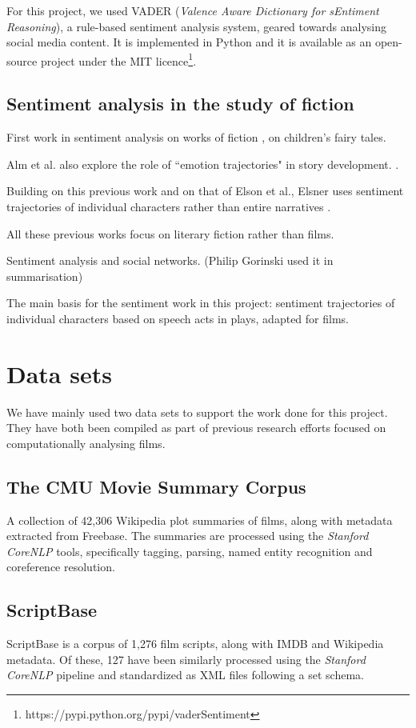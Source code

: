 \documentclass[bsc,frontabs,singlespacing,parskip, twoside]{infthesis}
\begin{document}
For this project, we used VADER (\textit{Valence Aware Dictionary for sEntiment Reasoning})\cite{hutto2014vader}, a rule-based sentiment analysis system, geared towards analysing social media content. It is implemented in Python and it is available as an open-source project under the MIT licence\footnote{https://pypi.python.org/pypi/vaderSentiment}.


\subsection{Sentiment analysis in the study of fiction}
First work in sentiment analysis on works of fiction \cite{alm2005emotions}, on children's fairy tales.

Alm et al. also explore the role of ``emotion trajectories" in story development. \cite{alm2005emotional}.

Building on this previous work and on that of Elson et al., Elsner uses sentiment trajectories of individual characters rather than entire narratives \cite{elsner2012character}.

All these previous works focus on literary fiction rather than films.

Sentiment analysis and social networks. (Philip Gorinski used it in summarisation)

The main basis for the sentiment work in this project: \cite{Nalisnick2013} sentiment trajectories of individual characters based on speech acts in plays, adapted for films.

\section{Data sets} \label{sec:data sets}
We have mainly used two data sets to support the work done for this project. They have both been compiled as part of previous research efforts focused on computationally analysing films.

\subsection{The CMU Movie Summary Corpus}
A collection of 42,306 Wikipedia plot summaries of films, along with metadata extracted from Freebase. The summaries are processed using the \textit{Stanford CoreNLP} tools, specifically tagging, parsing, named entity recognition and coreference resolution.

\subsection{ScriptBase}
ScriptBase \cite{Gorinski2015} is a corpus of 1,276 film scripts, along with IMDB and Wikipedia metadata. Of these, 127 have been similarly processed using the \textit{Stanford CoreNLP} pipeline and standardized as XML files following a set schema.
\end{document}
